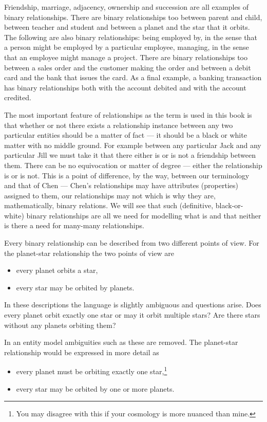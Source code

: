 \mynote
Friendship,  marriage, adjacency, ownership and succession are all examples of binary relationships. There are binary relationships too  between parent and child, between teacher and student and between a planet and the star that it orbits.   
The following are also binary relationships:
being employed by, in the sense that a person might be employed by a particular employee,
managing, in the sense that an employee might manage a project. 
There are binary relationships too between a sales order and the customer making the order and between a debit card and  the bank that issues the card. As a final example, a banking transaction has binary relationships both with the account debited and with the account credited. 

\mynote The most important feature of relationships as the term is used  in this book is that
whether or not there exists a relationship instance between any two particular entities 
should be a matter of fact --- it should be a  black or white matter with no middle ground. 
For example between any particular Jack and any particular Jill we must take it that there either is or is not a friendship between them. There can be no equivocation or matter of degree --- either the relationship is or is not. This is a point of difference, by the way, between our terminology and that of Chen --- Chen's relationships may have attributes (properties) assigned to them, our relationships may not which is why they are, mathematically, binary relations. We will see that such (definitive, black-or-white) binary relationships are all we need for modelling what is and that neither is there a need for many-many relationships. 

\mynote 
Every binary relationship can be described from two different points of view. 
For the planet-star relationship the two points of view are
\begin{itemize}
\item every planet orbits a star,
\item every star may be orbited by planets.
\end{itemize}

In these descriptions the language is slightly ambiguous and questions arise.
Does every planet orbit exactly one star or may it orbit multiple stars? 
Are there stars without any planets orbiting them?

In an entity model ambiguities such as these are removed. 
The planet-star relationship would be expressed in more detail as
\begin{itemize}
\item every planet must be orbiting exactly one star,\footnote{You may disagree with this if your cosmology is more nuanced than mine.}
\item every star may be orbited by one or more planets.
\end{itemize}


